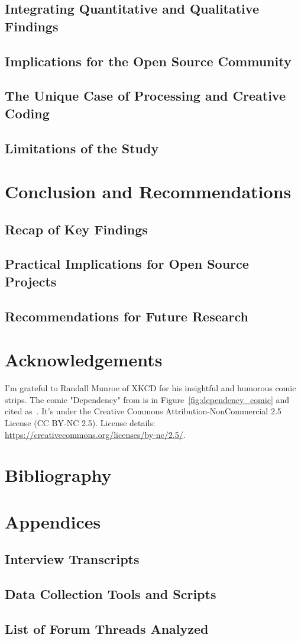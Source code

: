 \documentclass{article}
\newcommand{\getyear}[1]{\citeyear{#1}}
\begin{document}
\subsection{Integrating Quantitative and Qualitative Findings}
\subsection{Implications for the Open Source Community}
\subsection{The Unique Case of Processing and Creative Coding}
\subsection{Limitations of the Study}

\section{Conclusion and Recommendations}

\subsection{Recap of Key Findings}
\subsection{Practical Implications for Open Source Projects}
\subsection{Recommendations for Future Research}

\section{Acknowledgements}
I'm grateful to Randall Munroe of XKCD for his insightful and humorous comic strips. The comic "Dependency" from \getyear{munroeDependency2020} is in Figure~\ref{fig:dependency_comic} and cited as~\cite{munroeDependency2020}. It's under the Creative Commons Attribution-NonCommercial 2.5 License (CC BY-NC 2.5). License details: \url{https://creativecommons.org/licenses/by-nc/2.5/}.

\section{Bibliography}
\printbibliography

\section{Appendices}

\subsection{Interview Transcripts}


\subsection{Data Collection Tools and Scripts}
\subsection{List of Forum Threads Analyzed}
\end{document}
